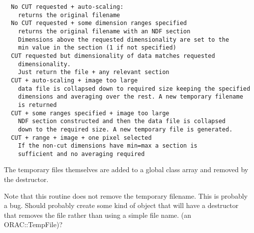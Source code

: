 \begin{description}
\begin{verbatim}
  No CUT requested + auto-scaling:
    returns the original filename
  No CUT requested + some dimension ranges specified
    returns the original filename with an NDF section
    Dimensions above the requested dimensionality are set to the
    min value in the section (1 if not specified)
  CUT requested but dimensionality of data matches requested
    dimensionality.
    Just return the file + any relevant section
  CUT + auto-scaling + image too large
    data file is collapsed down to required size keeping the specified
    dimensions and averaging over the rest. A new temporary filename
    is returned
  CUT + some ranges specified + image too large
    NDF section constructed and then the data file is collapsed
    down to the required size. A new temporary file is generated.
  CUT + range + image + one pixel selected
    If the non-cut dimensions have min=max a section is
    sufficient and no averaging required
\end{verbatim}


The temporary files themselves are added to a global class
array and removed by the destructor.



Note that this routine does not remove the temporary filename.
This is probably a bug. Should probably create some kind of
object that will have a destructor that removes the file rather
than using a simple file name. (an ORAC::TempFile)?

\end{description}
